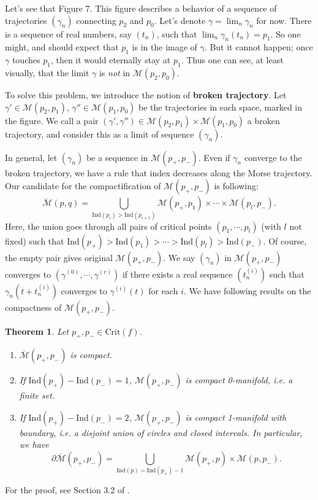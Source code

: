 \documentclass{article}
\newtheorem{theorem}{Theorem}[section]
\newcommand{\pp}{\partial}
\newcommand{\M}{\mathcal{M}}
\newcommand{\Crit}{\mathrm{Crit}}
\newcommand{\Ind}{\mathrm{Ind}}
\begin{document}
Let's see that Figure 7.
This figure describes a behavior of a sequence of trajectories $(\gamma_n)$ connecting $p_2$ and $p_0$.
Let's denote $\gamma=\lim_n\gamma_n$ for now.
There is a sequence of real numbers, say $(t_n)$, such that $\lim_n\gamma_n(t_n)=p_1$.
So one might, and should expect that $p_1$ is in the image of $\gamma$.
But it cannot happen; once $\gamma$ touches $p_1$, then it would eternally stay at $p_1$.
Thus one can see, at least visually, that the limit $\gamma$ is \emph{not} in $\M(p_2,p_0)$.

To solve this problem, we introduce the notion of \textbf{broken trajectory}.
Let $\gamma'\in\M(p_2,p_1)$, $\gamma''\in\M(p_1,p_0)$ be the trajectories in each space, marked in the figure.
We call a pair $(\gamma',\gamma'')\in\M(p_2,p_1)\times\M(p_1,p_0)$ a broken trajectory, and consider this as a limit of sequence $(\gamma_n)$.

In general, let $(\gamma_n)$ be a sequence in $\M(p_+,p_-)$.
Even if $\gamma_n$ converge to the broken trajectory, we have a rule that index decreases along the Morse trajectory.
Our candidate for the compactification of $\M(p_+,p_-)$ is following:
	$$\overline{\M}(p,q)=\bigcup_{\Ind(p_i)>\Ind(p_{i+1})}\M(p_+,p_1)\times\cdots\times\M(p_l,p_-).$$
Here, the union goes through all pairs of critical points $(p_1,\cdots,p_l)$ (with $l$ not fixed) such that $\Ind(p_+)>\Ind(p_1)>\cdots>\Ind(p_l)>\Ind(p_-)$.
Of course, the empty pair gives original $\M(p_+,p_-)$.
We say $(\gamma_n)$ in $\M(p_+,p_-)$ converges to $(\gamma^{(0)},\cdots,\gamma^{(r)})$ if there exists a real sequence $(t_n^{(i)})$ such that $\gamma_n(t+t_n^{(i)})$ converges to $\gamma^{(i)}(t)$ for each $i$.
We have following results on the compactness of $\M(p_+,p_-)$.
	\begin{theorem}\rm
	Let $p_+,p_-\in\Crit(f)$.
		\begin{enumerate}
		\item $\overline{\M}(p_+,p_-)$ is compact.
		\item If $\Ind(p_+)-\Ind(p_-)=1$, $\M(p_+,p_-)$ is compact 0-manifold, i.e. a finite set.
		\item If $\Ind(p_+)-\Ind(p_-)=2$, $\M(p_+,p_-)$ is compact 1-manifold with boundary, i.e. a disjoint union of circles and closed intervals.
		In particular, we have
			$$\pp\overline{\M}(p_+,p_-)=\bigcup_{\Ind(p)=\Ind(p_+)-1}\M(p_+,p)\times\M(p,p_-).$$
		\end{enumerate}
	\end{theorem}
For the proof, see Section 3.2 of \cite{ad}.
\end{document}
